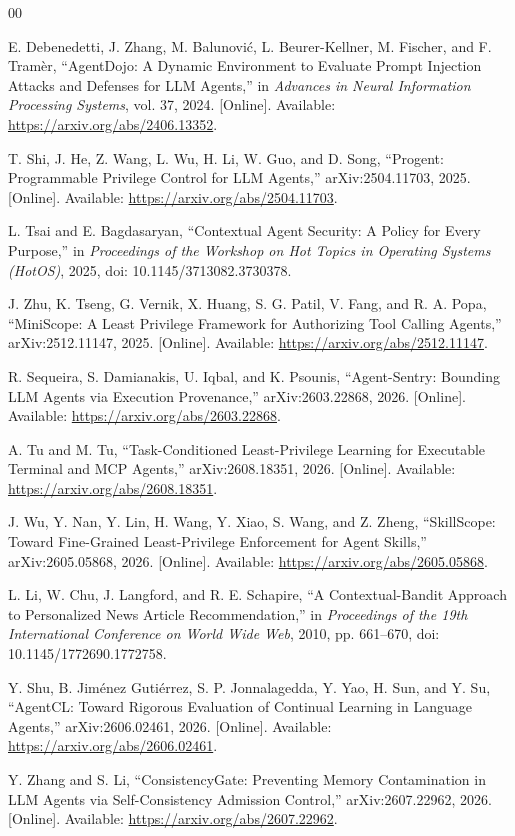 \documentclass[10pt,conference]{IEEEtran}
\begin{document}
\begin{thebibliography}{00}

E. Debenedetti, J. Zhang, M. Balunovi\'c,
L. Beurer-Kellner, M. Fischer, and F. Tram\`er,
``AgentDojo: A Dynamic Environment to Evaluate
Prompt Injection Attacks and Defenses for LLM Agents,''
in \emph{Advances in Neural Information Processing Systems},
vol. 37, 2024.
[Online]. Available:
\url{https://arxiv.org/abs/2406.13352}.

T. Shi, J. He, Z. Wang, L. Wu, H. Li, W. Guo,
and D. Song,
``Progent: Programmable Privilege Control for LLM Agents,''
arXiv:2504.11703, 2025.
[Online]. Available:
\url{https://arxiv.org/abs/2504.11703}.

L. Tsai and E. Bagdasaryan,
``Contextual Agent Security: A Policy for Every Purpose,''
in \emph{Proceedings of the Workshop on Hot Topics
in Operating Systems (HotOS)}, 2025,
doi: 10.1145/3713082.3730378.

J. Zhu, K. Tseng, G. Vernik, X. Huang,
S. G. Patil, V. Fang, and R. A. Popa,
``MiniScope: A Least Privilege Framework for
Authorizing Tool Calling Agents,''
arXiv:2512.11147, 2025.
[Online]. Available:
\url{https://arxiv.org/abs/2512.11147}.

R. Sequeira, S. Damianakis, U. Iqbal,
and K. Psounis,
``Agent-Sentry: Bounding LLM Agents via
Execution Provenance,''
arXiv:2603.22868, 2026.
[Online]. Available:
\url{https://arxiv.org/abs/2603.22868}.

A. Tu and M. Tu,
``Task-Conditioned Least-Privilege Learning for
Executable Terminal and MCP Agents,''
arXiv:2608.18351, 2026.
[Online]. Available:
\url{https://arxiv.org/abs/2608.18351}.

J. Wu, Y. Nan, Y. Lin, H. Wang, Y. Xiao,
S. Wang, and Z. Zheng,
``SkillScope: Toward Fine-Grained Least-Privilege
Enforcement for Agent Skills,''
arXiv:2605.05868, 2026.
[Online]. Available:
\url{https://arxiv.org/abs/2605.05868}.

L. Li, W. Chu, J. Langford, and R. E. Schapire,
``A Contextual-Bandit Approach to Personalized
News Article Recommendation,''
in \emph{Proceedings of the 19th International
Conference on World Wide Web}, 2010,
pp. 661--670,
doi: 10.1145/1772690.1772758.

Y. Shu, B. Jim\'enez Guti\'errez,
S. P. Jonnalagedda, Y. Yao, H. Sun,
and Y. Su,
``AgentCL: Toward Rigorous Evaluation of
Continual Learning in Language Agents,''
arXiv:2606.02461, 2026.
[Online]. Available:
\url{https://arxiv.org/abs/2606.02461}.

Y. Zhang and S. Li,
``ConsistencyGate: Preventing Memory Contamination
in LLM Agents via Self-Consistency Admission Control,''
arXiv:2607.22962, 2026.
[Online]. Available:
\url{https://arxiv.org/abs/2607.22962}.

\end{thebibliography}
\end{document}
